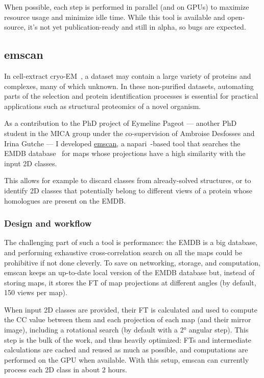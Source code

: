 When possible, each step is performed in parallel (and on GPUs) to maximize resource usage and minimize idle time.
While this tool is available and open-source, it's not yet publication-ready and still in alpha, so bugs are expected.

\subsection{emscan}\label{emscan}

In cell-extract cryo-EM~\cite{suBuildRetrieveMethodology2021,kyrilisIntegrativeBiologyNative2019}, a dataset may contain a large variety of proteins and complexes, many of which unknown.
In these non-purified datasets, automating parts of the selection and protein identification processes is essential for practical applications such as structural proteomics of a novel organism.

As a contribution to the PhD project of Eymeline Pageot --- another PhD student in the MICA group under the co-supervision of Ambroise Desfosses and Irina Gutche --- I developed \href{https://gihub.com/brisvag/emscan}{emscan}, a napari~\cite{thenaparicommunityNapariMultidimensionalImage2024}-based tool that searches the EMDB database~\cite{thewwpdbconsortiumEMDBElectronMicroscopy2024} for maps whose projections have a high similarity with the input 2D classes.

This allows for example to discard classes from already-solved structures, or to identify 2D classes that potentially belong to different views of a protein whose homologues are present on the EMDB.

\subsubsection{Design and workflow}

The challenging part of such a tool is performance: the EMDB is a big database, and performing exhaustive cross-correlation search on all the maps could be prohibitive if not done cleverly.
To save on networking, storage, and computation, emscan keeps an up-to-date local version of the EMDB database but, instead of storing maps, it stores the FT of map projections at different angles (by default, 150 views per map).

When input 2D classes are provided, their FT is calculated and used to compute the CC value between them and each projection of each map (and their mirror image), including a rotational search (by default with a 2° angular step).
This step is the bulk of the work, and thus heavily optimized: FTs and intermediate calculations are cached and reused as much as possible, and computations are performed on the GPU when available.
With this setup, emscan can currently process each 2D class in about 2 hours.


